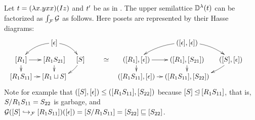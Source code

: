 \begin{example}
Let $t = (\lambda x. yxx)(Iz)$
and $t'$ be as in .
The upper semilattice $\mathbb{D}^{\lambda}(t)$ can be factorized as $\int_{\mathcal{F}}{\mathcal{G}}$
as follows. Here posets are represented by their Hasse diagrams:
\[
\begin{array}{ccc}
  \xymatrix@R=.3cm@C=.3cm{
  &
    \cls{\emptyDerivation}
    \ar@/_.25cm/[dl]
    \ar@/^.25cm/[dr]
  &
  &
  \\
    \cls{\redex_1}
    \ar[d]
    \ar[r]
  &
    \cls{\redex_1\redextwo_{21}}
    \ar[d]
  &
    \cls{\redextwo}
    \ar@/^.25cm/[dl]
  \\
    \cls{\redex_1\redextwo_{11}}
    \ar[r]
  &
    \cls{\redex_1 \sqcup \redextwo}
  }
&
  \raisebox{-.85cm}{$\simeq$}
&
  \xymatrix@R=.3cm@C=.3cm{
  &
    (\cls{\emptyDerivation},\cls{\emptyDerivation})
    \ar@/_.25cm/[dl]
    \ar@/^.25cm/[dr]
  &
  &
  \\
    (\cls{\redex_1},\cls{\emptyDerivation})
    \ar[d]
    \ar[r]
  &
    (\cls{\redex_1},\cls{\redextwo_{21}})
    \ar[d]
  &
    (\cls{\redextwo},\cls{\emptyDerivation})
    \ar@/^.25cm/[dl]
  \\
    (\cls{\redex_1\redextwo_{11}},\cls{\emptyDerivation})
    \ar[r]
  &
    (\cls{\redex_1\redextwo_{11}},\cls{\redextwo_{22}})
  }
\end{array}
\]
Note for example
that $({[S]},{[\epsilon]}) \leq ({[R_1S_{11}]},{[S_{22}]})$
because ${[S]} \unlhd {[R_1S_{11}]}$, that is,
$S/R_1S_{11} = S_{22}$ is garbage,
and
$\mathcal{G}({[S]} \hookrightarrow_{\mathcal{F}} {[R_1S_{11}]})({[\epsilon]})
= {[S/R_1S_{11}]} = {[S_{22}]} \sqsubseteq {[S_{22}]}$.
\end{example}

